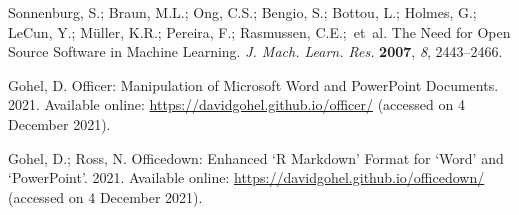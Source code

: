 \documentclass[psych,tutorial,accept,moreauthors,pdftex]{Definitions/mdpi}
\begin{document}
\begin{thebibliography}{999}
Sonnenburg, S.; Braun, M.L.; Ong, C.S.; Bengio, S.; Bottou, L.; Holmes, G.; LeCun, Y.; Müller, K.R.; Pereira, F.; Rasmussen, C.E.;~et~al. The Need for Open Source Software in Machine Learning. \emph{J. Mach. Learn. Res.} \textbf{2007}, \emph{8}, 2443--2466.

Gohel, D. Officer: Manipulation of Microsoft Word and PowerPoint Documents. {2021.} Available online: \url{https://davidgohel.github.io/officer/} (accessed on 4 December 2021).  %

Gohel, D.; Ross, N. Officedown: Enhanced ‘R Markdown’ Format for ‘Word’ and ‘PowerPoint’. {2021.} Available online: \url{https://davidgohel.github.io/officedown/} (accessed on 4 December 2021).  %
\end{thebibliography}
\end{document}
